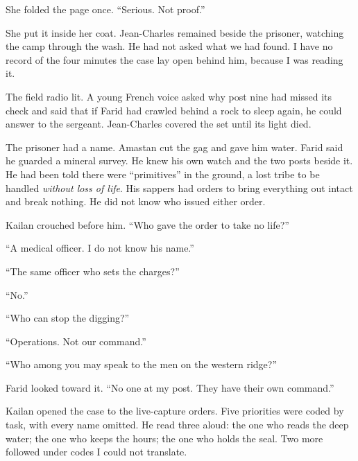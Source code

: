 She folded the page once. ``Serious. Not proof.''\par

She put it inside her coat. Jean-Charles remained beside the prisoner, watching the camp through the wash. He had not asked what we had found. I have no record of the four minutes the case lay open behind him, because I was reading it.\par

The field radio lit. A young French voice asked why post nine had missed its check and said that if Farid had crawled behind a rock to sleep again, he could answer to the sergeant. Jean-Charles covered the set until its light died.\par

The prisoner had a name. Amastan cut the gag and gave him water. Farid said he guarded a mineral survey. He knew his own watch and the two posts beside it. He had been told there were ``primitives'' in the ground, a lost tribe to be handled \emph{without loss of life}. His sappers had orders to bring everything out intact and break nothing. He did not know who issued either order.\par

Kailan crouched before him. ``Who gave the order to take no life?''\par

``A medical officer. I do not know his name.''\par

``The same officer who sets the charges?''\par

``No.''\par

``Who can stop the digging?''\par

``Operations. Not our command.''\par

``Who among you may speak to the men on the western ridge?''\par

Farid looked toward it. ``No one at my post. They have their own command.''\par

Kailan opened the case to the live-capture orders. Five priorities were coded by task, with every name omitted. He read three aloud: the one who reads the deep water; the one who keeps the hours; the one who holds the seal. Two more followed under codes I could not translate.\par

